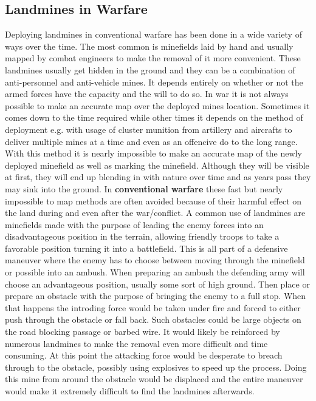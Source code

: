 \subsection{Landmines in Warfare}

Deploying landmines in conventional warfare has been done in a wide variety of ways over the time. The most common is minefields laid by hand and usually mapped by combat engineers to make the removal of it more convenient. These landmines usually get hidden in the ground and they can be a combination of anti-personnel and anti-vehicle mines. It depends entirely on whether or not the armed forces have the capacity and the will to do so. In war it is not always possible to make an accurate map over the deployed mines location. Sometimes it comes down to the time required while other times it depends on the method of deployment e.g. with usage of cluster munition from artillery and aircrafts to deliver multiple mines at a time and even as an offencive do to the long range. With this method it is nearly impossible to make an accurate map of the newly deployed minefield as well as marking the minefield. Although they will be visible at first, they will end up blending in with nature over time and as years pass they may sink into the ground. In \textbf{conventional warfare} these fast but nearly impossible to map methods are often avoided because of their harmful effect on the land during and even after the war/conflict. A common use of landmines are minefields made with the purpose of leading the enemy forces into an disadvantageous position in the terrain, allowing friendly troops to take a favorable position turning it into a battlefield. This is all part of a defensive maneuver where the enemy has to choose between moving through the minefield or possible into an ambush. When preparing an ambush the defending army will choose an advantageous position, usually some sort of high ground. Then place or prepare an obstacle with the purpose of bringing the enemy to a full stop. When that happens the introding force would be taken under fire and forced to either push through the obstacle or fall back. Such obstacles could be large objects on the road blocking passage or barbed wire. It would likely be reinforced by numerous landmines to make the removal even more difficult and time consuming. At this point the attacking force would be desperate to breach through to the obstacle, possibly using explosives to speed up the process. Doing this mine from around the obstacle would be displaced and the entire maneuver would make it extremely difficult to find the landmines afterwards.

